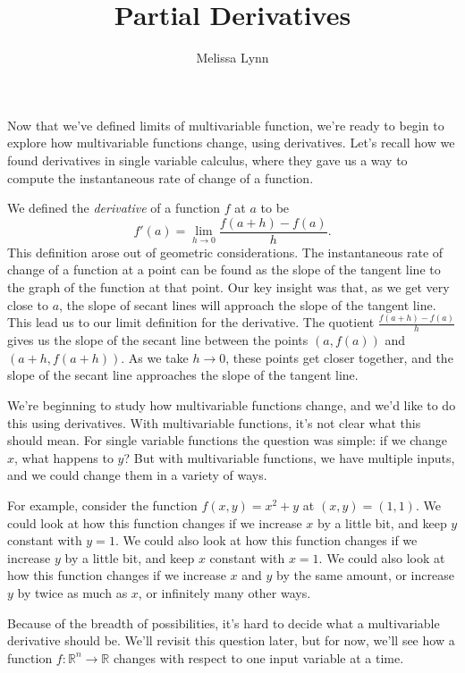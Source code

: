 \documentclass{ximera}
\title{Partial Derivatives}
\author{Melissa Lynn}
\begin{document}
\begin{abstract}
\end{abstract}
\maketitle

Now that we've defined limits of multivariable function, we're ready to begin to explore how multivariable functions change, using derivatives. Let's recall how we found derivatives in single variable calculus, where they gave us a way to compute the instantaneous rate of change of a function.

We defined the \emph{derivative} of a function $f$ at $a$ to be
\[
f'(a) = \lim_{h\rightarrow 0}\frac{f(a+h)-f(a)}{h}.
\]
This definition arose out of geometric considerations. The instantaneous rate of change of a function at a point can be found as the slope of the tangent line to the graph of the function at that point. Our key insight was that, as we get very close to $a$, the slope of secant lines will approach the slope of the tangent line. This lead us to our limit definition for the derivative. The quotient $\frac{f(a+h)-f(a)}{h}$ gives us the slope of the secant line between the points $(a,f(a))$ and $(a+h, f(a+h))$. As we take $h\rightarrow 0$, these points get closer together, and the slope of the secant line approaches the slope of the tangent line.


We're beginning to study how multivariable functions change, and we'd like to do this using derivatives. With multivariable functions, it's not clear what this should mean. For single variable functions the question was simple: if we change $x$, what happens to $y$? But with multivariable functions, we have multiple inputs, and we could change them in a variety of ways.

For example, consider the function $f(x,y) = x^2+y$ at $(x,y)=(1,1)$. We could look at how this function changes if we increase $x$ by a little bit, and keep $y$ constant with $y=1$. We could also look at how this function changes if we increase $y$ by a little bit, and keep $x$ constant with $x=1$. We could also look at how this function changes if we increase $x$ and $y$ by the same amount, or increase $y$ by twice as much as $x$, or infinitely many other ways.

Because of the breadth of possibilities, it's hard to decide what a multivariable derivative should be. We'll revisit this question later, but for now, we'll see how a function $f:\mathbb{R}^n\rightarrow \mathbb{R}$ changes with respect to one input variable at a time.
\end{document}
